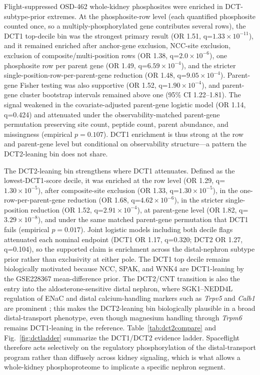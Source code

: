 \documentclass[11pt]{article}
\newcommand{\gene}[1]{\textit{#1}}
\begin{document}
Flight-suppressed OSD-462 whole-kidney phosphosites were enriched in DCT-subtype-prior extremes. At the phosphosite-row level (each quantified phosphosite counted once, so a multiply-phosphorylated gene contributes several rows), the DCT1 top-decile bin was the strongest primary result (OR 1.51, q=$1.33\times10^{-11}$), and it remained enriched after anchor-gene exclusion, NCC-site exclusion, exclusion of composite/multi-position rows (OR 1.38, q=$2.0\times10^{-6}$), one phosphosite row per parent gene (OR 1.49, q=$6.59\times10^{-4}$), and the stricter single-position-row-per-parent-gene reduction (OR 1.48, q=$9.05\times10^{-4}$). Parent-gene Fisher testing was also supportive (OR 1.52, q=$1.90\times10^{-4}$), and parent-gene cluster bootstrap intervals remained above one (95\% CI 1.22--1.81). The signal weakened in the covariate-adjusted parent-gene logistic model (OR 1.14, q=0.424) and attenuated under the observability-matched parent-gene permutation preserving site count, peptide count, parent abundance, and missingness (empirical $p=0.107$). DCT1 enrichment is thus strong at the row and parent-gene level but conditional on observability structure---a pattern the DCT2-leaning bin does not share.

The DCT2-leaning bin strengthens where DCT1 attenuates. Defined as the lowest-DCT1-score decile, it was enriched at the row level (OR 1.29, q=$1.30\times10^{-5}$), after composite-site exclusion (OR 1.33, q=$1.30\times10^{-5}$), in the one-row-per-parent-gene reduction (OR 1.68, q=$4.62\times10^{-6}$), in the stricter single-position reduction (OR 1.52, q=$2.91\times10^{-4}$), at parent-gene level (OR 1.82, q=$3.29\times10^{-8}$), and under the same matched parent-gene permutation that DCT1 fails (empirical $p=0.017$). Joint logistic models including both decile flags attenuated each nominal endpoint (DCT1 OR 1.17, q=0.320; DCT2 OR 1.27, q=0.104), so the supported claim is enrichment across the distal-nephron subtype prior rather than exclusivity at either pole. The DCT1 top decile remains biologically motivated because NCC, SPAK, and WNK4 are DCT1-leaning by the GSE228367 mean-difference prior. The DCT2/CNT transition is also the entry into the aldosterone-sensitive distal nephron, where SGK1--NEDD4L regulation of ENaC and distal calcium-handling markers such as \gene{Trpv5} and \gene{Calb1} are prominent \citep{arroyo2011aldosterone,subramanya2014dct,su2024dct}; this makes the DCT2-leaning bin biologically plausible in a broad distal-transport phenotype, even though magnesium handling through \gene{Trpm6} remains DCT1-leaning in the reference. Table~\ref{tab:dct2compare} and Fig.~\ref{fig:dctladder} summarize the DCT1/DCT2 evidence ladder. Spaceflight therefore acts selectively on the regulatory phosphorylation of the distal-transport program rather than diffusely across kidney signaling, which is what allows a whole-kidney phosphoproteome to implicate a specific nephron segment.
\end{document}
